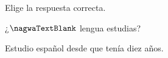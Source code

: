 
\begin{question}

\begin{instance}
    
\begin{mcq}[standalone=false]
      
\begin{stem}
        Elige la respuesta correcta.\par
        
\begin{enumerationnolabel}
          \item{¿$\nagwaTextBlank$ lengua estudias?}          \item{Estudio español desde que tenía diez años.}        
\end{enumerationnolabel}
      
\end{stem}
      
\begin{distractors}
\end{distractors}
                      
\end{mcq}
  
\end{instance}

\end{question}

